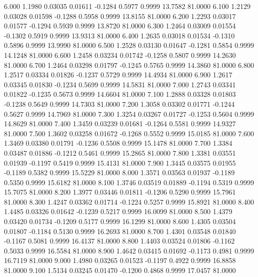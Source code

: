    6.000   1.1980   0.03035   0.01611  -0.1284   0.5977   0.9999  13.7582  81.0000
   6.100   1.2129   0.03028   0.01598  -0.1288   0.5958   0.9999  13.8155  81.0000
   6.200   1.2293   0.03017   0.01577  -0.1294   0.5939   0.9999  13.8720  81.0000
   6.300   1.2464   0.03009   0.01554  -0.1302   0.5919   0.9999  13.9313  81.0000
   6.400   1.2635   0.03018   0.01534  -0.1310   0.5896   0.9999  13.9990  81.0000
   6.500   1.2528   0.03130   0.01647  -0.1281   0.5854   0.9999  14.1248  81.0000
   6.600   1.2458   0.03234   0.01742  -0.1258   0.5807   0.9999  14.2630  81.0000
   6.700   1.2464   0.03298   0.01797  -0.1245   0.5765   0.9999  14.3860  81.0000
   6.800   1.2517   0.03334   0.01826  -0.1237   0.5729   0.9999  14.4934  81.0000
   6.900   1.2617   0.03345   0.01830  -0.1234   0.5699   0.9999  14.5831  81.0000
   7.000   1.2743   0.03341   0.01822  -0.1235   0.5673   0.9999  14.6604  81.0000
   7.100   1.2888   0.03328   0.01803  -0.1238   0.5649   0.9999  14.7303  81.0000
   7.200   1.3058   0.03302   0.01771  -0.1244   0.5627   0.9999  14.7969  81.0000
   7.300   1.3254   0.03267   0.01727  -0.1253   0.5604   0.9999  14.8629  81.0000
   7.400   1.3459   0.03239   0.01681  -0.1264   0.5581   0.9999  14.9327  81.0000
   7.500   1.3602   0.03258   0.01672  -0.1268   0.5552   0.9999  15.0185  81.0000
   7.600   1.3469   0.03380   0.01791  -0.1236   0.5508   0.9999  15.1478  81.0000
   7.700   1.3384   0.03487   0.01886  -0.1212   0.5461   0.9999  15.2865  81.0000
   7.800   1.3381   0.03551   0.01939  -0.1197   0.5419   0.9999  15.4131  81.0000
   7.900   1.3445   0.03575   0.01955  -0.1189   0.5382   0.9999  15.5229  81.0000
   8.000   1.3571   0.03563   0.01937  -0.1189   0.5350   0.9999  15.6182  81.0000
   8.100   1.3746   0.03519   0.01889  -0.1194   0.5319   0.9999  15.7075  81.0000
   8.200   1.3977   0.03446   0.01811  -0.1206   0.5290   0.9999  15.7961  81.0000
   8.300   1.4247   0.03362   0.01714  -0.1224   0.5257   0.9999  15.8921  81.0000
   8.400   1.4485   0.03326   0.01642  -0.1239   0.5217   0.9999  16.0099  81.0000
   8.500   1.4379   0.03420   0.01734  -0.1209   0.5177   0.9999  16.1299  81.0000
   8.600   1.4305   0.03504   0.01807  -0.1184   0.5130   0.9999  16.2693  81.0000
   8.700   1.4301   0.03548   0.01840  -0.1167   0.5081   0.9999  16.4137  81.0000
   8.800   1.4403   0.03524   0.01806  -0.1162   0.5033   0.9999  16.5584  81.0000
   8.900   1.4642   0.03415   0.01692  -0.1173   0.4981   0.9999  16.7119  81.0000
   9.000   1.4980   0.03265   0.01523  -0.1197   0.4922   0.9999  16.8858  81.0000
   9.100   1.5134   0.03245   0.01470  -0.1200   0.4868   0.9999  17.0457  81.0000
